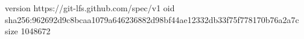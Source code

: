 version https://git-lfs.github.com/spec/v1
oid sha256:962692d9c8bcaa1079a646236882d98bf44ae12332db33f75f778170b76a2a7c
size 1048672
